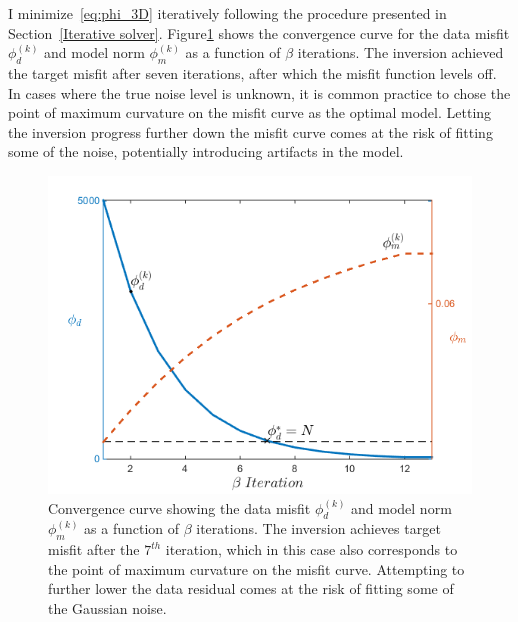 I minimize~\ref{eq:phi_3D} iteratively following the procedure presented in Section~\ref{Iterative solver}.
Figure\ref{fig:Convergence_curve} shows the convergence curve for the data misfit $\phi_d^{(k)}$ and model norm $\phi_m^{(k)}$ as a function of $\beta$ iterations. 
The inversion achieved the target misfit after seven iterations, after which the misfit function levels off. 
In cases where the true noise level is unknown, it is common practice to chose the point of maximum curvature on the misfit curve as the optimal model. 
Letting the inversion progress further down the misfit curve comes at the risk of fitting some of the noise, potentially introducing artifacts in the model.
\begin{figure}[h!]
\centering
\includegraphics[scale=0.6]{Convergence_curve.png}
\caption{Convergence curve showing the data misfit $\phi_d^{(k)}$ and model norm $\phi_m^{(k)}$ as a function of $\beta$ iterations. The inversion achieves target misfit after the $7^{th}$ iteration, which in this case also corresponds to the point of maximum curvature on the misfit curve. Attempting to further lower the data residual comes at the risk of fitting some of the Gaussian noise.}
\label{fig:Convergence_curve}
\end{figure}

